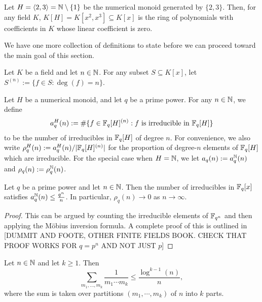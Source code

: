 \begin{eg}
Let $H = \langle 2,3 \rangle = \mathbb{N} \setminus \{1\}$ be the numerical monoid generated by $\{2,3\}$.
Then, for any field $K$, $K[H] = K[x^2,x^3] \subseteq K[x]$ is the ring of polynomials with coefficients in $K$ whose linear coefficient is zero.
\end{eg}

We have one more collection of definitions to state before we can proceed toward the main goal of this section.

\begin{defn}
Let $K$ be a field and let $n\in \mathbb{N}$.
For any subset $S \subseteq K[x]$, let $S^{(n)} := \{f\in S: \deg(f) = n\}$.

Let $H$ be a numerical monoid, and let $q$ be a prime power.
For any $n\in \mathbb{N}$, we define 
\[a_q^H(n) := \#\{f\in \mathbb{F}_q[H]^{(n)}: f \textrm{ is irreducible in } \mathbb{F}_q[H] \}\]
to be the number of irreducibles in $\mathbb{F}_q[H]$ of degree $n$.
For convenience, we also write $\rho_q^H(n) := a_q^H(n)/|\mathbb{F}_q[H]^{(n)}|$ for the proportion of degree-$n$ elements of $\mathbb{F}_q[H]$ which are irreducible.
For the special case when $H = \mathbb{N}$, we let $a_q(n) := a_q^{\mathbb{N}}(n)$ and $\rho_q(n) := \rho_q^{\mathbb{N}}(n)$.
\end{defn}

\begin{prop}\label{prop:atoms in Fqx}
Let $q$ be a prime power and let $n\in \mathbb{N}$.
Then the number of irreducibles in $\mathbb{F}_q[x]$ satisfies $a_q^{\mathbb{N}}(n) \le \frac{q^n}{n}$.
In particular, $\rho_q(n) \to 0$ as $n\to\infty$.
\end{prop}

\begin{proof}
This can be argued by counting the irreducible elements of $\mathbb{F}_{q^n}$ and then applying the M\"{o}bius inversion formula.
A complete proof of this is outlined in [DUMMIT AND FOOTE, OTHER FINITE FIELDS BOOK.  CHECK THAT PROOF WORKS FOR $q=p^n$ AND NOT JUST $p$]
\end{proof}

\begin{lemma}\label{lem:srpp log bound}
Let $n\in \mathbb{N}$ and let $k\ge 1$. 
Then
\[\sum_{m_1,\dots,m_k} \frac{1}{m_1\cdots m_k} \le \frac{\log^{k-1}(n)}{n}, \]
where the sum is taken over partitions $(m_1,\cdots,m_k)$ of $n$ into $k$ parts.
\end{lemma}

